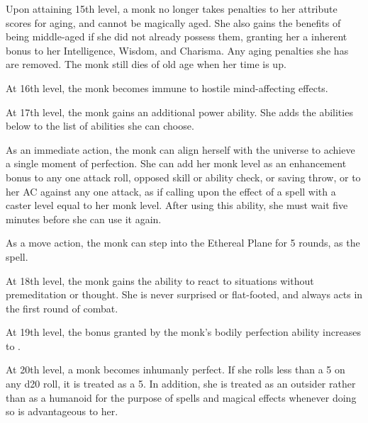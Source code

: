  Upon attaining 15th level, a monk no longer takes penalties to her attribute scores for aging, and cannot be magically aged. She also gains the benefits of being middle-aged if she did not already possess them, granting her a  inherent bonus to her Intelligence, Wisdom, and Charisma. Any aging penalties she has are removed. The monk still dies of old age when her time is up.

 At 16th level, the monk becomes immune to hostile mind-affecting effects.

 At 17th level, the monk gains an additional \ki power ability. She adds the abilities below to the list of abilities she can choose.

 As an immediate action, the monk can align herself with the universe to achieve a single moment of perfection. She can add her monk level as an enhancement bonus to any one attack roll, opposed skill or ability check, or saving throw, or to her AC against any one attack, as if calling upon the effect of a  spell with a caster level equal to her monk level. After using this ability, she must wait five minutes before she can use it again.

 As a move action, the monk can step into the Ethereal Plane for 5 rounds, as the  spell.

 At 18th level, the monk gains the ability to react to situations without premeditation or thought. She is never surprised or flat-footed, and always acts in the first round of combat.

 At 19th level, the bonus granted by the monk's bodily perfection ability increases to .

 At 20th level, a monk becomes inhumanly perfect. If she rolls less than a 5 on any d20 roll, it is treated as a 5. In addition, she is treated as an outsider rather than as a humanoid for the purpose of spells and magical effects whenever doing so is advantageous to her.

